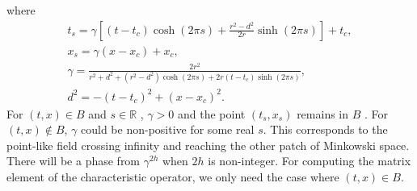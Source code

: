 \documentclass[a4paper,11pt]{article}
\theoremstyle{definition}
\theoremstyle{remark}
\begin{document}
where
\begin{gather}
    t_s = \gamma \left[(t-t_c)\cosh(2\pi s) + \frac{r^2-d^2}{2r}\sinh(2\pi s)\right] + t_c,\\
    x_s = \gamma (x-x_c) + x_c,\\
    \gamma = \frac{2r^2}{r^2+d^2 + (r^2-d^2)\cosh(2\pi s) +2r(t-t_c)\sinh(2\pi s)}, \\
    d^2 = -(t-t_c)^2 + (x-x_c)^2.
\end{gather}
For $(t,x) \in B$ and $s\in \mathbb{R}$ , $\gamma>0$ and the point $(t_s,x_s)$ remains in $B$ . For $(t,x) \notin B$, $\gamma$ could be non-positive for some real $s$. This corresponds to the point-like field crossing infinity and reaching the other patch of Minkowski space. There will be a phase from $\gamma^{2h}$ when $2h$ is non-integer. For computing the matrix element of the characteristic operator, we only need the case where $(t,x) \in B$.
\end{document}
